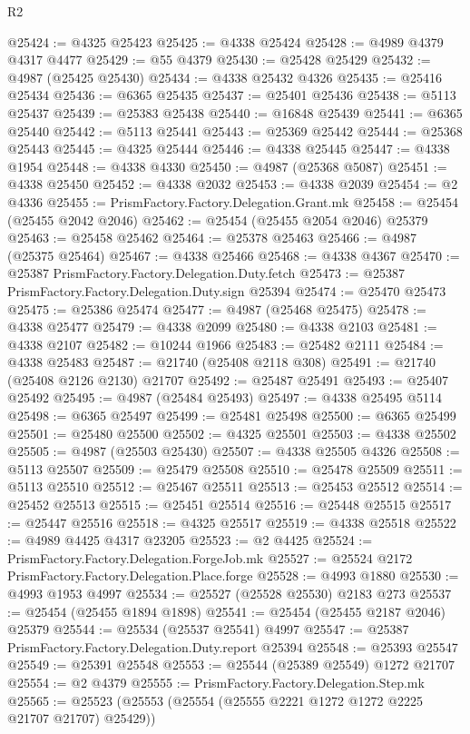 \begin{lexlean}{R2}
\begin{coremodule}
@25424 := @4325 @25423
@25425 := @4338 @25424
@25428 := @4989 @4379 @4317 @4477
@25429 := @55 @4379
@25430 := @25428 @25429
@25432 := @4987 (@25425 @25430)
@25434 := @4338 @25432 @4326
@25435 := @25416 @25434
@25436 := @6365 @25435
@25437 := @25401 @25436
@25438 := @5113 @25437
@25439 := @25383 @25438
@25440 := @16848 @25439
@25441 := @6365 @25440
@25442 := @5113 @25441
@25443 := @25369 @25442
@25444 := @25368 @25443
@25445 := @4325 @25444
@25446 := @4338 @25445
@25447 := @4338 @1954
@25448 := @4338 @4330
@25450 := @4987 (@25368 @5087)
@25451 := @4338 @25450
@25452 := @4338 @2032
@25453 := @4338 @2039
@25454 := @2 @4336
@25455 := PrismFactory.Factory.Delegation.Grant.mk
@25458 := @25454 (@25455 @2042 @2046)
@25462 := @25454 (@25455 @2054 @2046) @25379
@25463 := @25458 @25462
@25464 := @25378 @25463
@25466 := @4987 (@25375 @25464)
@25467 := @4338 @25466
@25468 := @4338 @4367
@25470 := @25387 PrismFactory.Factory.Delegation.Duty.fetch
@25473 := @25387 PrismFactory.Factory.Delegation.Duty.sign @25394
@25474 := @25470 @25473
@25475 := @25386 @25474
@25477 := @4987 (@25468 @25475)
@25478 := @4338 @25477
@25479 := @4338 @2099
@25480 := @4338 @2103
@25481 := @4338 @2107
@25482 := @10244 @1966
@25483 := @25482 @2111
@25484 := @4338 @25483
@25487 := @21740 (@25408 @2118 @308)
@25491 := @21740 (@25408 @2126 @2130) @21707
@25492 := @25487 @25491
@25493 := @25407 @25492
@25495 := @4987 (@25484 @25493)
@25497 := @4338 @25495 @5114
@25498 := @6365 @25497
@25499 := @25481 @25498
@25500 := @6365 @25499
@25501 := @25480 @25500
@25502 := @4325 @25501
@25503 := @4338 @25502
@25505 := @4987 (@25503 @25430)
@25507 := @4338 @25505 @4326
@25508 := @5113 @25507
@25509 := @25479 @25508
@25510 := @25478 @25509
@25511 := @5113 @25510
@25512 := @25467 @25511
@25513 := @25453 @25512
@25514 := @25452 @25513
@25515 := @25451 @25514
@25516 := @25448 @25515
@25517 := @25447 @25516
@25518 := @4325 @25517
@25519 := @4338 @25518
@25522 := @4989 @4425 @4317 @23205
@25523 := @2 @4425
@25524 := PrismFactory.Factory.Delegation.ForgeJob.mk
@25527 := @25524 @2172 PrismFactory.Factory.Delegation.Place.forge
@25528 := @4993 @1880
@25530 := @4993 @1953 @4997
@25534 := @25527 (@25528 @25530) @2183 @273
@25537 := @25454 (@25455 @1894 @1898)
@25541 := @25454 (@25455 @2187 @2046) @25379
@25544 := @25534 (@25537 @25541) @4997
@25547 := @25387 PrismFactory.Factory.Delegation.Duty.report @25394
@25548 := @25393 @25547
@25549 := @25391 @25548
@25553 := @25544 (@25389 @25549) @1272 @21707
@25554 := @2 @4379
@25555 := PrismFactory.Factory.Delegation.Step.mk
@25565 := @25523 (@25553 (@25554 (@25555 @2221 @1272 @1272 @2225 @21707 @21707) @25429))

\end{coremodule}
\end{lexlean}
